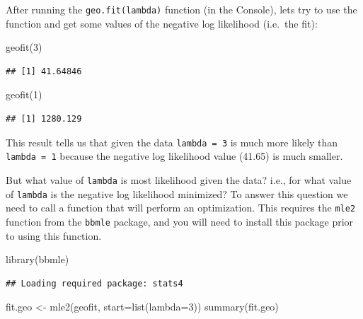 \documentclass[
]{book}
\newenvironment{Shaded}{\begin{snugshade}}{\end{snugshade}}
\newcommand{\AttributeTok}[1]{\textcolor[rgb]{0.77,0.63,0.00}{#1}}
\newcommand{\DecValTok}[1]{\textcolor[rgb]{0.00,0.00,0.81}{#1}}
\newcommand{\FunctionTok}[1]{\textcolor[rgb]{0.00,0.00,0.00}{#1}}
\newcommand{\NormalTok}[1]{#1}
\newcommand{\OtherTok}[1]{\textcolor[rgb]{0.56,0.35,0.01}{#1}}
\begin{document}
After running the \texttt{geo.fit(lambda)} function (in the Console), lets try to use the function and get some values of the negative log likelihood (i.e.~the fit):

\begin{Shaded}
\begin{Highlighting}[]
\FunctionTok{geofit}\NormalTok{(}\DecValTok{3}\NormalTok{)}
\end{Highlighting}
\end{Shaded}

\begin{verbatim}
## [1] 41.64846
\end{verbatim}

\begin{Shaded}
\begin{Highlighting}[]
\FunctionTok{geofit}\NormalTok{(}\DecValTok{1}\NormalTok{)}
\end{Highlighting}
\end{Shaded}

\begin{verbatim}
## [1] 1280.129
\end{verbatim}

This result tells us that given the data \texttt{lambda\ =\ 3} is much more likely than \texttt{lambda\ =\ 1} because the negative log likelihood value (41.65) is much smaller.

But what value of \texttt{lambda} is most likelihood given the data? i.e., for what value of \texttt{lambda} is the negative log likelihood minimized? To answer this question we need to call a function that will perform an optimization. This requires the \texttt{mle2} function from the \texttt{bbmle} package, and you will need to install this package prior to using this function.

\begin{Shaded}
\begin{Highlighting}[]
\FunctionTok{library}\NormalTok{(bbmle)}
\end{Highlighting}
\end{Shaded}

\begin{verbatim}
## Loading required package: stats4
\end{verbatim}

\begin{Shaded}
\begin{Highlighting}[]
\NormalTok{fit.geo }\OtherTok{\textless{}{-}} \FunctionTok{mle2}\NormalTok{(geofit, }\AttributeTok{start=}\FunctionTok{list}\NormalTok{(}\AttributeTok{lambda=}\DecValTok{3}\NormalTok{))}
\FunctionTok{summary}\NormalTok{(fit.geo)}
\end{Highlighting}
\end{Shaded}
\end{document}
